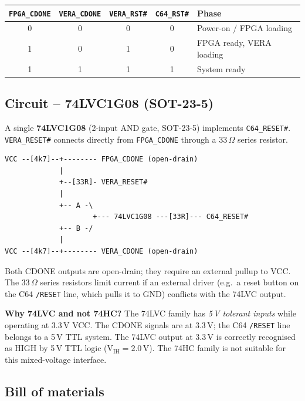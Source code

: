 \documentclass[11pt,a4paper]{article}
\newcommand{\sig}[1]{\texttt{#1}}
\begin{document}
\begin{center}
\begin{tabular}{ccccl}
\toprule
\sig{FPGA\_CDONE} & \sig{VERA\_CDONE} &
\sig{VERA\_RST\#} & \sig{C64\_RST\#} & \textbf{Phase} \\
\midrule
0 & 0 & 0 & 0 & Power-on / FPGA loading \\
1 & 0 & 1 & 0 & FPGA ready, VERA loading \\
1 & 1 & 1 & 1 & System ready \\
\bottomrule
\end{tabular}
\end{center}

\subsection{Circuit -- 74LVC1G08 (SOT-23-5)}

A single \textbf{74LVC1G08} (2-input AND gate, SOT-23-5) implements
\sig{C64\_RESET\#}.  \sig{VERA\_RESET\#} connects directly from
\sig{FPGA\_CDONE} through a 33\,$\Omega$ series resistor.

\begin{lstlisting}[style=shell]
VCC --[4k7]--+-------- FPGA_CDONE (open-drain)
             |
             +--[33R]- VERA_RESET#
             |
             +-- A -\
                     +--- 74LVC1G08 ---[33R]--- C64_RESET#
             +-- B -/
             |
VCC --[4k7]--+-------- VERA_CDONE (open-drain)
\end{lstlisting}

Both CDONE outputs are open-drain; they require an external pullup to
VCC\@.  The 33\,$\Omega$ series resistors limit current if an external
driver (e.g.\ a reset button on the C64 \sig{/RESET} line, which pulls it
to GND) conflicts with the 74LVC output.

\textbf{Why 74LVC and not 74HC?}  The 74LVC family has \emph{5\,V
tolerant inputs} while operating at 3.3\,V VCC\@.  The CDONE signals
are at 3.3\,V; the C64 \sig{/RESET} line belongs to a 5\,V TTL system.
The 74LVC output at 3.3\,V is correctly recognised as HIGH by 5\,V TTL
logic (V$_{\text{IH}} = 2.0$\,V).  The 74HC family is not suitable for
this mixed-voltage interface.

\subsection{Bill of materials}
\end{document}
